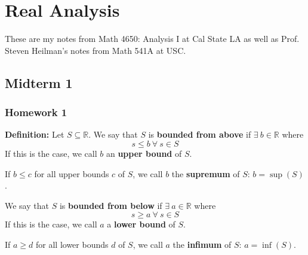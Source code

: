 %
%
%
%
%
%
%
%
%
%
%
%
%

\section{Real Analysis}

These are my notes from Math 4650: Analysis I at Cal State LA as well as Prof. Steven Heilman's notes from Math 541A at USC.


\subsection{Midterm 1}

\subsubsection{Homework 1}

\textbf{Definition:} Let \(S \subseteq \mathbb{R}\). We say that \(S\) is \textbf{bounded from above} if \(\exists \ b \in \mathbb{R}\) where \[s \leq b \ \forall \ s \in S\]If this is the case, we call \(b\) an \textbf{upper bound} of \(S\).

If \(b \leq c \) for all upper bounds \(c\) of \(S\), we call \(b\) the \textbf{supremum} of \(S\): \(b = \sup(S)\).

We say that \(S\) is \textbf{bounded from below} if \(\exists \ a \in \mathbb{R}\) where \[s \geq a \ \forall \ s \in S\]If this is the case, we call \(a\) a \textbf{lower bound} of \(S\).

If \(a \geq d \) for all lower bounds \(d\) of \(S\), we call \(a\) the \textbf{infimum} of \(S\): \(a = \inf(S)\).

